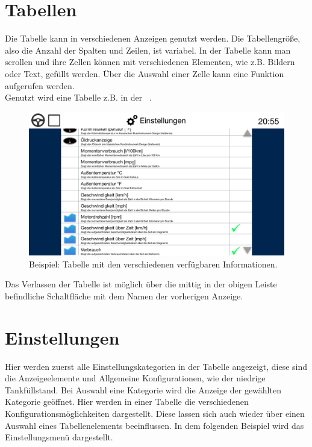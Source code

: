 \documentclass[pflichtenheft.tex]{subfiles}
\begin{document}
\clearpage
\section{Tabellen}

Die Tabelle kann in verschiedenen Anzeigen genutzt werden. Die Tabellengröße, also die Anzahl der Spalten und Zeilen, ist variabel. In der Tabelle kann man scrollen und ihre Zellen können mit verschiedenen Elementen, wie z.B. Bildern oder Text, gefüllt werden. Über die Auswahl einer Zelle kann eine Funktion aufgerufen werden.\\
Genutzt wird eine Tabelle z.B. in der ~. 

\begin{figure}[H]
  	\begin{center}
 		\includegraphics[width=\textwidth]{Images/GUI-SettingsDashes.png}
  		\caption{Beispiel: Tabelle mit den verschiedenen verfügbaren Informationen.}
  	\end{center}
\end{figure}


Das Verlassen der Tabelle ist möglich über die mittig in der obigen Leiste befindliche Schaltfläche mit dem Namen der vorherigen Anzeige. 

\clearpage
\section{Einstellungen}
Hier werden zuerst alle Einstellungskategorien in der Tabelle angezeigt, diese sind die Anzeigeelemente und Allgemeine Konfigurationen, wie der niedrige Tankfüllstand. Bei Auswahl eine Kategorie wird die Anzeige der gewählten Kategorie geöffnet. Hier werden in einer Tabelle die verschiedenen Konfigurationsmöglichkeiten dargestellt. Diese lassen sich auch wieder über einen Auswahl eines Tabellenelements beeinflussen. 
In dem folgenden Beispiel wird das Einstellungsmenü dargestellt.
\end{document}
